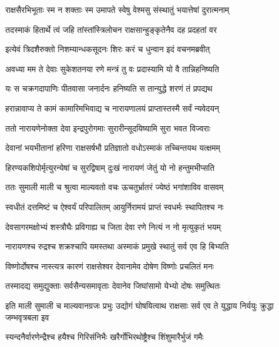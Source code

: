 \twolineshloka
{राक्षसैरभिभूताः स्म न शक्ताः स्म उमापते}
{स्वेषु वेश्मसु संस्थातुं भयात्तेषां दुरात्मनाम्} %

\twolineshloka
{तदस्माकं हितार्थे त्वं जहि तांस्तांस्त्रिलोचन}
{राक्षसान्हुङ्कृतेनैव दह प्रदहतां वर} %

\twolineshloka
{इत्येवं त्रिदशैरुक्तो निशम्यान्धकसूदनः}
{शिरः करं च धुन्वान इदं वचनमब्रवीत्} %

\twolineshloka
{अवध्या मम ते देवाः सुकेशतनया रणे}
{मन्त्रं तु वः प्रदास्यामि यो वै तान्निहनिष्यति} %

\twolineshloka
{यः स चक्रगदापाणिः पीतवासा जनार्दनः}
{हनिष्यति स तान्युद्धे शरणं तं प्रपद्यथ} %

\twolineshloka
{हरान्नावाप्य ते कामं कामारिमभिवाद्य च}
{नारायणालयं प्राप्तास्तस्मै सर्वं न्यवेदयन्} %

\twolineshloka
{ततो नारायणेनोक्ता देवा इन्द्रपुरोगमाः}
{सुरारीन्सूदयिष्यामि सुरा भवत विज्वराः} %

\twolineshloka
{देवानां भयभीतानां हरिणा राक्षसर्षभौ}
{प्रतिज्ञातो वधोऽस्माकं तच्चिन्तयथ यत्क्षमम्} %

\twolineshloka
{हिरण्यकशिपोर्मृत्युरन्येषां च सुरद्विषाम्}
{दुःखं नारायणं जेतुं यो नो हन्तुमभीप्सति} %

\twolineshloka
{ततः सुमाली माली च श्रुत्वा माल्यवतो वचः}
{ऊचतुर्भ्रातरं ज्येष्ठं भगांशाविव वासवम्} %

\twolineshloka
{स्वधीतं दत्तमिष्टं च ऐश्वर्यं परिपालितम्}
{आयुर्निरामयं प्राप्तं स्वधर्मः स्थापितश्च नः} %

\twolineshloka
{देवसागरमक्षोभ्यं शस्त्रौघैः प्रविगाह्य च}
{जिता देवा रणे नित्यं न नो मृत्युकृतं भयम्} %

\twolineshloka
{नारायणश्च रुद्रश्च शक्रश्चापि यमस्तथा}
{अस्माकं प्रमुखे स्थातुं सर्व एव हि बिभ्यति} %

\twolineshloka
{विष्णोर्दोषश्च नास्त्यत्र कारणं राक्षसेश्वर}
{देवानामेव दोषेण विष्णोः प्रचलितं मनः} %

\twolineshloka
{तस्मादद्य समुद्युक्ताः सर्वसैन्यसमावृताः}
{देवानेव जिघांसामो येभ्यो दोषः समुत्थितः} %

\threelineshloka
{इति माली सुमाली च माल्यवानग्रजः प्रभुः}
{उद्योगं घोषयित्वाथ राक्षसाः सर्व एव ते}
{युद्धाय निर्ययुः क्रुद्धा जम्भवृत्रबला इव} %

\twolineshloka
{स्यन्दनैर्वारणेन्द्रैश्च हयैश्च गिरिसंनिभैः}
{खरैर्गोभिरथोष्ट्रैश्च शिंशुमारैर्भुजं गमैः} %

